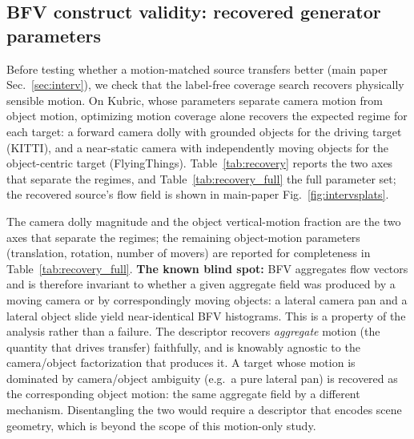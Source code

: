 \documentclass[runningheads]{llncs}
\begin{document}
\subsection{BFV construct validity: recovered generator parameters}
\label{supp:recovery}
Before testing whether a motion-matched source transfers better (main paper
Sec.~\ref{sec:interv}), we check that the label-free coverage search recovers
physically sensible motion. On Kubric, whose parameters separate camera motion
from object motion, optimizing motion coverage alone recovers the expected regime
for each target: a forward camera dolly with grounded objects for the driving
target (KITTI), and a near-static camera with independently moving objects for the
object-centric target (FlyingThings). Table~\ref{tab:recovery} reports the two axes
that separate the regimes, and Table~\ref{tab:recovery_full} the full parameter
set; the recovered source's flow field is shown in main-paper
Fig.~\ref{fig:intervsplats}.

\begin{table}[h]
\centering
\caption{\textbf{Recovered motion parameters} from the geometry-only, label-free
coverage search. The camera and object motion read off the recovered parameters
match the known structure of each target.}
\label{tab:recovery}
\small

\end{table}

The camera dolly magnitude and the object
vertical-motion fraction are the two axes that separate the regimes; the
remaining object-motion parameters (translation, rotation, number of movers)
are reported for completeness in Table~\ref{tab:recovery_full}. \textbf{The known blind spot:} BFV aggregates
flow vectors and is therefore invariant to whether a given aggregate field was
produced by a moving camera or by correspondingly moving objects: a lateral
camera pan and a lateral object slide yield near-identical BFV histograms. This
is a property of the analysis rather than a failure. The descriptor recovers
\emph{aggregate} motion (the quantity that drives transfer) faithfully, and is
knowably agnostic to the camera/object factorization that produces it. A
target whose motion is dominated by camera/object ambiguity (e.g.\ a pure
lateral pan) is recovered as the corresponding object motion: the same
aggregate field by a different mechanism. Disentangling the two would require a
descriptor that encodes scene geometry, which is beyond the scope of this
motion-only study.

\begin{table}[h]
\centering
\caption{Full recovered generator parameters from BFV-only search.}
\label{tab:recovery_full}
\small

\end{table}
\end{document}
